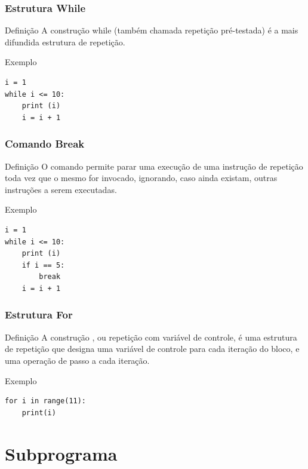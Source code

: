 \documentclass[aspectratio=169]{beamer} %
\begin{document}
\begin{frame}[fragile]
\frametitle{Estrutura While}

\begin{block}{Definição}
A construção while (também chamada repetição pré-testada) é a mais difundida estrutura de repetição.
\end{block}\vfill

\begin{exampleblock}{Exemplo}
\begin{lstlisting}
i = 1
while i <= 10:
    print (i)
    i = i + 1
\end{lstlisting}
\end{exampleblock}
\end{frame}

\begin{frame}[fragile]
\frametitle{Comando Break}

\begin{block}{Definição}
O comando  permite parar uma execução de uma instrução de repetição toda vez que o mesmo for invocado, ignorando, caso ainda existam, outras instruções a serem executadas.
\end{block}\vfill

\begin{exampleblock}{Exemplo}
	\begin{lstlisting}
i = 1
while i <= 10:
    print (i)
    if i == 5: 
        break
    i = i + 1
	\end{lstlisting}
\end{exampleblock}
\end{frame}

\begin{frame}[fragile]
\frametitle{Estrutura For}

\begin{block}{Definição}
A construção , ou repetição com variável de controle, é uma estrutura de repetição que designa uma variável de controle para cada iteração do bloco, e uma operação de passo a cada iteração.
\end{block}\vfill

\begin{exampleblock}{Exemplo}
	\begin{lstlisting}
for i in range(11):
    print(i)
	\end{lstlisting}
\end{exampleblock}
\end{frame}

\section{Subprograma}
\end{document}
